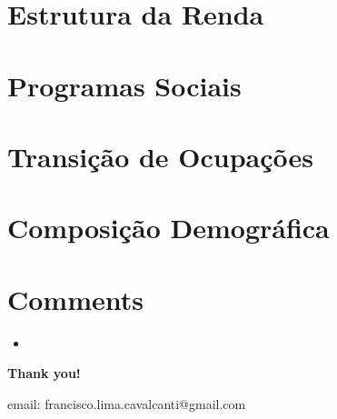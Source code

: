\documentclass[11pt]{beamer}
\begin{document}
\section{Estrutura da Renda}



\section{Programas Sociais}



\section{Transição de Ocupações}



\section{Composição Demográfica}



\section{Comments}



\begin{frame}{}

\begin{itemize}
	\item{}	
\end{itemize}


\end{frame}

\frame
{
    \begin{center}
     \vfill
    \textbf{Thank you!}
     \\

     \begin{small}
     email: francisco.lima.cavalcanti@gmail.com
     \end{small}
     \vfill
\end{center}
}
\end{document}
